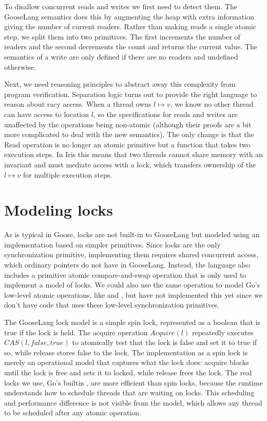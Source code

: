 To disallow concurrent reads and writes we first need to detect them.
The GooseLang semantics does this by augmenting the heap with extra
information giving the number of current readers. Rather than making
reads a single atomic step, we split them into two primitives. The first
increments the number of readers and the second decrements the count and
returns the current value. The semantics of a write are only defined if
there are no readers and undefined otherwise.

Next, we need reasoning principles to abstract away this complexity from
program verification. Separation logic turns out to provide the right
language to reason about racy access. When a thread owns
$l \mapsto v$, we know no other thread can have access to location
$l$, so the specifications for reads and writes are unaffected by the
operations being non-atomic (although their proofs are a bit more
complicated to deal with the new semantics). The only change is that the
Read operation is no longer an atomic primitive but a function that
takes two execution steps. In Iris this means that two threads cannot
share memory with an invariant and must mediate access with a lock,
which transfers ownership of the $l \mapsto v$ for multiple execution
steps.

\section{Modeling locks}

As is typical in Goose, locks are not built-in to GooseLang but modeled
using an implementation based on simpler primitives. Since locks are the
only synchronization primitive, implementing them requires shared
concurrent access, which ordinary pointers do not have in GooseLang.
Instead, the language also includes a primitive atomic compare-and-swap
operation that is only used to implement a model of locks. We could also
use the same operation to model Go's low-level atomic operations, like
 and , but
have not implemented this yet since we don't have code that uses these
low-level synchronization primitives.

The GooseLang lock model is a simple spin lock, represented as a boolean
that is true if the lock is held. The acquire operation $Acquire(l)$
repeatedly executes $CAS(l, false, true)$ to atomically test that the
lock is false and set it to true if so, while release stores false to
the lock. The implementation as a spin lock is merely an operational
model that captures what the lock does: acquire blocks until the lock is
free and sets it to locked, while release frees the lock. The real locks
we use, Go's builtin , are more efficient than spin
locks, because the runtime understands how to schedule threads that are
waiting on locks. This scheduling and performance difference is not
visible from the model, which allows any thread to be scheduled after
any atomic operation.

